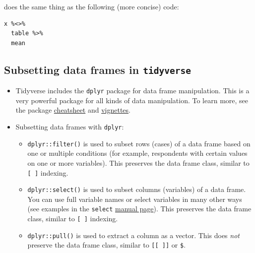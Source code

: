 \documentclass[
]{book}
\newenvironment{Shaded}{\begin{snugshade}}{\end{snugshade}}
\newcommand{\CommentTok}[1]{\textcolor[rgb]{0.56,0.35,0.01}{\textit{#1}}}
\newcommand{\FunctionTok}[1]{\textcolor[rgb]{0.00,0.00,0.00}{#1}}
\newcommand{\NormalTok}[1]{#1}
\newcommand{\OtherTok}[1]{\textcolor[rgb]{0.56,0.35,0.01}{#1}}
\newcommand{\SpecialCharTok}[1]{\textcolor[rgb]{0.00,0.00,0.00}{#1}}
\providecommand{\tightlist}{%
  \setlength{\itemsep}{0pt}\setlength{\parskip}{0pt}}
\begin{document}
does the same thing as the following (more concise) code:

\begin{verbatim}
x %<>%
  table %>%
  mean
\end{verbatim}

\hypertarget{subsetting-data-frames-in-tidyverse}{%
\subsection{\texorpdfstring{Subsetting data frames in \texttt{tidyverse}}{Subsetting data frames in tidyverse}}\label{subsetting-data-frames-in-tidyverse}}

\begin{itemize}
\tightlist
\item
  Tidyverse includes the \texttt{dplyr} package for data frame manipulation. This is a very powerful package for all kinds of data manipulation. To learn more, see the package \href{https://www.rstudio.com/wp-content/uploads/2015/02/data-wrangling-cheatsheet.pdf}{cheatsheet} and \href{https://dplyr.tidyverse.org/articles/index.html}{vignettes}.
\item
  Subsetting data frames with \texttt{dplyr}:

  \begin{itemize}
  \tightlist
  \item
    \texttt{dplyr::filter()} is used to subset rows (cases) of a data frame based on one or multiple conditions (for example, respondents with certain values on one or more variables). This preserves the data frame class, similar to \texttt{{[}\ {]}} indexing.
  \item
    \texttt{dplyr::select()} is used to subset columns (variables) of a data frame. You can use full variable names or select variables in many other ways (see examples in the \texttt{select} \href{https://dplyr.tidyverse.org/reference/select.html}{manual page}). This preserves the data frame class, similar to \texttt{{[}\ {]}} indexing.
  \item
    \texttt{dplyr::pull()} is used to extract a column as a vector. This does \emph{not} preserve the data frame class, similar to \texttt{{[}{[}\ {]}{]}} or \texttt{\$}.
  \end{itemize}
\end{itemize}

\begin{Shaded}
\end{Shaded}
\end{document}
